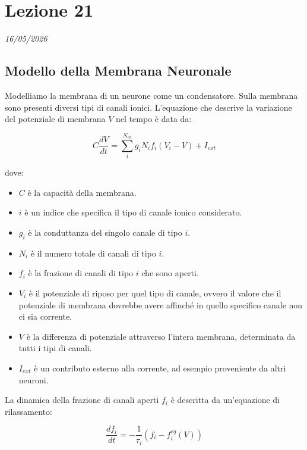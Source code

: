\chapter{Lezione 21}
\label{capitolo_21}
\textit{16/05/2026}

\section{Modello della Membrana Neuronale}
Modelliamo la membrana di un neurone come un condensatore. Sulla membrana sono presenti diversi tipi di canali ionici.
L'equazione che descrive la variazione del potenziale di membrana $V$ nel tempo è data da:

\begin{equation} \label{eq:ch21_1}
C\frac{dV}{dt} = \sum_{i}^{N_{ch}} g_{i}N_{i}f_{i}(V_{i}-V) + I_{ext}
\end{equation}

dove:
\begin{itemize}
    \item $C$ è la capacità della membrana.
    \item $i$ è un indice che specifica il tipo di canale ionico considerato.
    \item $g_i$ è la conduttanza del singolo canale di tipo $i$.
    \item $N_i$ è il numero totale di canali di tipo $i$.
    \item $f_i$ è la frazione di canali di tipo $i$ che sono aperti.
    \item $V_i$ è il potenziale di riposo per quel tipo di canale, ovvero il valore che il potenziale di membrana dovrebbe avere affinché in quello specifico canale non ci sia corrente.
    \item $V$ è la differenza di potenziale attraverso l'intera membrana, determinata da tutti i tipi di canali.
    \item $I_{ext}$ è un contributo esterno alla corrente, ad esempio proveniente da altri neuroni.
\end{itemize}

La dinamica della frazione di canali aperti $f_i$ è descritta da un'equazione di rilassamento:

\begin{equation} \label{eq:ch21_2}
\frac{df_i}{dt} = -\frac{1}{\tau_i}(f_i - f_i^{eq}(V))
\end{equation}

